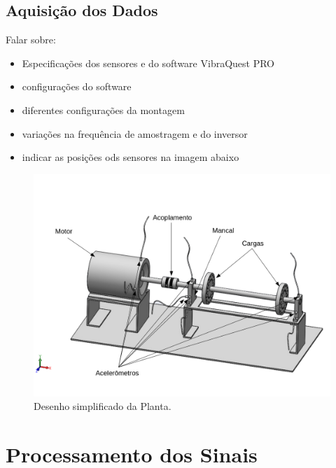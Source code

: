 % 

\subsection{Aquisição dos Dados}

Falar sobre: 
\begin{itemize}
    \item Especificações dos sensores e do software VibraQuest PRO
    \item configurações do software
    \item diferentes configurações da montagem
    \item variações na frequência de amostragem e do inversor
    \item indicar as posições ods sensores na imagem abaixo 
\end{itemize}

\begin{figure}[H]
    \caption{Desenho simplificado da Planta.}
    \begin{center}
        \includegraphics[scale=.5]{metodologia/img/lateral_desenho.png}
    \end{center}
    \label{fig:satelite_completo}
\end{figure}
% 

\section{Processamento dos Sinais}

